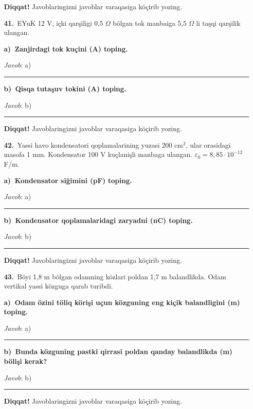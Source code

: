 \documentclass[11pt,a4paper]{article}
\newcommand{\blank}{\rule{5cm}{0.4pt}}
\begin{document}
\medskip\noindent\textbf{Diqqat!} Javoblaringizni javoblar varaqasiga köçirib yozing.\par\vspace{10pt}
\noindent\textbf{41.}\ EYuK 12 V, içki qarşiligi 0,5 $\Omega$ bölgan tok manbaiga 5,5 $\Omega$ li taşqi qarşilik ulangan.\par\smallskip
\medskip\noindent\textbf{a)\ Zanjirdagi tok kuçini (A) toping.}\par
\noindent\textit{Javob}: a)\ \blank\par
\medskip\noindent\textbf{b)\ Qisqa tutaşuv tokini (A) toping.}\par
\noindent\textit{Javob}: b)\ \blank\par
\medskip\noindent\textbf{Diqqat!} Javoblaringizni javoblar varaqasiga köçirib yozing.\par\vspace{10pt}
\noindent\textbf{42.}\ Yassi havo kondensatori qoplamalarining yuzasi 200 cm$^2$, ular orasidagi masofa 1 mm. Kondensator 100 V kuçlanişli manbaga ulangan. $\varepsilon_0=8{,}85\cdot10^{-12}$ F/m.\par\smallskip
\medskip\noindent\textbf{a)\ Kondensator siğimini (pF) toping.}\par
\noindent\textit{Javob}: a)\ \blank\par
\medskip\noindent\textbf{b)\ Kondensator qoplamalaridagi zaryadni (nC) toping.}\par
\noindent\textit{Javob}: b)\ \blank\par
\medskip\noindent\textbf{Diqqat!} Javoblaringizni javoblar varaqasiga köçirib yozing.\par\vspace{10pt}
\noindent\textbf{43.}\ Böyi 1,8 m bölgan odamning közlari poldan 1,7 m balandlikda. Odam vertikal yassi közguga qarab turibdi.\par\smallskip
\medskip\noindent\textbf{a)\ Odam özini töliq körişi uçun közguning eng kiçik balandligini (m) toping.}\par
\noindent\textit{Javob}: a)\ \blank\par
\medskip\noindent\textbf{b)\ Bunda közguning pastki qirrasi poldan qanday balandlikda (m) bölişi kerak?}\par
\noindent\textit{Javob}: b)\ \blank\par
\medskip\noindent\textbf{Diqqat!} Javoblaringizni javoblar varaqasiga köçirib yozing.\par\vspace{10pt}
\end{document}
